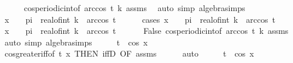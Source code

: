 \begin{isabellebody}
\ \ \ \ \isamarkupfalse%
\ cos{\isacharunderscore}{\kern0pt}periodic{\isacharunderscore}{\kern0pt}int{\isacharbrackleft}{\kern0pt}of\ {\isachardoublequoteopen}{\isacharminus}{\kern0pt}arccos\ t{\isachardoublequoteclose}\ k{\isacharbrackright}{\kern0pt}\ assms\ \isamarkupfalse%
\ {\isacharparenleft}{\kern0pt}auto\ simp{\isacharcolon}{\kern0pt}\ algebra{\isacharunderscore}{\kern0pt}simps{\isacharparenright}{\kern0pt}\isanewline
\ \ \isamarkupfalse%
\ \isamarkupfalse%
\ {\isachardoublequoteopen}x\ {\isacharless}{\kern0pt}\ {}\ {\isacharasterisk}{\kern0pt}\ pi\ {\isacharasterisk}{\kern0pt}\ real{\isacharunderscore}{\kern0pt}of{\isacharunderscore}{\kern0pt}int\ k\ {\isacharplus}{\kern0pt}\ arccos\ t{\isachardoublequoteclose}\isanewline
\ \ \ \ \isamarkupfalse%
\ {\isacharparenleft}{\kern0pt}cases\ {\isachardoublequoteopen}x\ {\isacharequal}{\kern0pt}\ {}\ {\isacharasterisk}{\kern0pt}\ pi\ {\isacharasterisk}{\kern0pt}\ real{\isacharunderscore}{\kern0pt}of{\isacharunderscore}{\kern0pt}int\ k\ {\isacharplus}{\kern0pt}\ arccos\ t{\isachardoublequoteclose}{\isacharparenright}{\kern0pt}\isanewline
\ \ \ \ \isamarkupfalse%
\ {\isacartoucheopen}x\ {\isasymle}\ {}\ {\isacharasterisk}{\kern0pt}\ pi\ {\isacharasterisk}{\kern0pt}\ real{\isacharunderscore}{\kern0pt}of{\isacharunderscore}{\kern0pt}int\ k\ {\isacharplus}{\kern0pt}\ arccos\ t{\isacartoucheclose}\isanewline
\ \ \ \ \ \ False\ cos{\isacharunderscore}{\kern0pt}periodic{\isacharunderscore}{\kern0pt}int{\isacharbrackleft}{\kern0pt}of\ {\isachardoublequoteopen}arccos\ t{\isachardoublequoteclose}\ k{\isacharbrackright}{\kern0pt}\ assms\ \isamarkupfalse%
\ {\isacharparenleft}{\kern0pt}auto\ simp{\isacharcolon}{\kern0pt}\ algebra{\isacharunderscore}{\kern0pt}simps{\isacharparenright}{\kern0pt}\isanewline
\ \ \isamarkupfalse%
\ \isamarkupfalse%
\ {\isachardoublequoteopen}t\ {\isacharless}{\kern0pt}\ cos\ x{\isachardoublequoteclose}\ \isamarkupfalse%
\ cos{\isacharunderscore}{\kern0pt}greater{\isacharunderscore}{\kern0pt}iff{\isacharbrackleft}{\kern0pt}of\ t\ x{\isacharcomma}{\kern0pt}\ THEN\ iffD{}{\isacharcomma}{\kern0pt}\ OF\ assms{\isacharbrackright}{\kern0pt}\isanewline
\ \ \ \ \isamarkupfalse%
\ auto\isanewline
\ \ \isamarkupfalse%
\ \isamarkupfalse%
\ {\isachardoublequoteopen}t\ {\isasymle}\ cos\ x{\isachardoublequoteclose}\ \isamarkupfalse%

\end{isabellebody}
